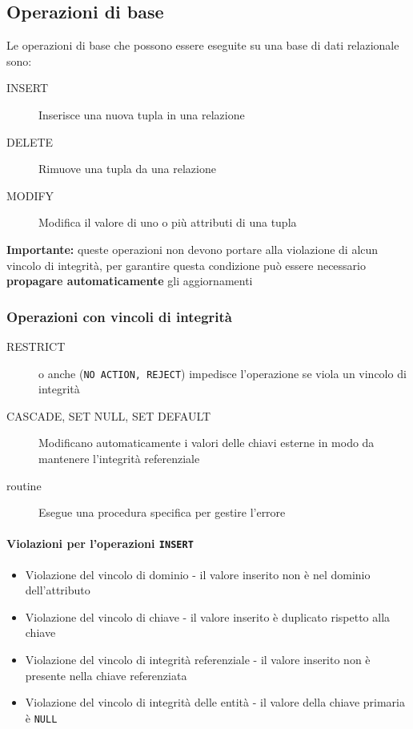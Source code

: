     \subsection{Operazioni di base}
        Le operazioni di base che possono essere eseguite su una base di dati relazionale sono:
        \begin{description}
            \item[INSERT] Inserisce una nuova tupla in una relazione 
            \item[DELETE] Rimuove una tupla da una relazione
            \item[MODIFY] Modifica il valore di uno o più attributi di una tupla
        \end{description}
        \textbf{Importante:} queste operazioni non devono portare alla violazione di alcun vincolo di integrità, per garantire questa condizione può essere necessario \textbf{propagare automaticamente} gli aggiornamenti
        \subsubsection{Operazioni con vincoli di integrità}
            \begin{description}
                \item[RESTRICT] o anche (\texttt{NO ACTION, REJECT}) impedisce l'operazione se viola un vincolo di integrità
                \item[CASCADE, SET NULL, SET DEFAULT] Modificano automaticamente i valori delle chiavi esterne in modo da mantenere l'integrità referenziale
                \item[routine] Esegue una procedura specifica per gestire l'errore
            \end{description}
            \paragraph{Violazioni per l'operazioni \texttt{INSERT}}
                \begin{itemize}
                    \item Violazione del vincolo di dominio - il valore inserito non è nel dominio dell'attributo
                    \item Violazione del vincolo di chiave - il valore inserito è duplicato rispetto alla chiave
                    \item Violazione del vincolo di integrità referenziale - il valore inserito non è presente nella chiave referenziata
                    \item Violazione del vincolo di integrità delle entità - il valore della chiave primaria è \texttt{NULL}
                \end{itemize}
